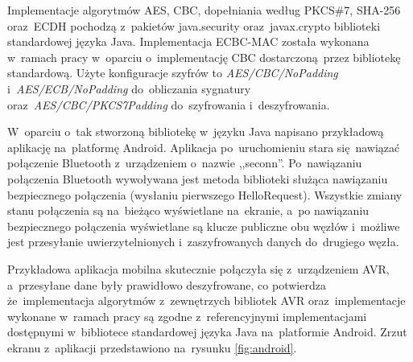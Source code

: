 Implementacje algorytmów AES, CBC, dopełniania według PKCS\#7, SHA-256 oraz~ECDH pochodzą z~pakietów java.security oraz~javax.crypto biblioteki standardowej języka Java. Implementacja ECBC-MAC została wykonana w~ramach pracy w~oparciu o~implementację CBC dostarczoną przez bibliotekę standardową. Użyte konfiguracje szyfrów to \emph{AES/CBC/NoPadding} i~\emph{AES/ECB/NoPadding} do~obliczania sygnatury oraz~\emph{AES/CBC/PKCS7Padding} do~szyfrowania i~deszyfrowania.

W~oparciu o~tak stworzoną bibliotekę w~języku Java napisano przykładową aplikację na~platformę Android. Aplikacja po~uruchomieniu stara się nawiązać połączenie Bluetooth z~urządzeniem o~nazwie ,,seconn''. Po~nawiązaniu połączenia Bluetooth wywoływana jest metoda biblioteki służąca nawiązaniu bezpiecznego połączenia (wysłaniu pierwszego HelloRequest). Wszystkie zmiany stanu połączenia są na~bieżąco wyświetlane na~ekranie, a~po nawiązaniu bezpiecznego połączenia wyświetlane są klucze publiczne obu węzłów i~możliwe jest przesyłanie uwierzytelnionych i~zaszyfrowanych danych do~drugiego węzła.

Przykładowa aplikacja mobilna skutecznie połączyła się z~urządzeniem AVR, a~przesyłane dane były prawidłowo deszyfrowane, co potwierdza że~implementacja algorytmów z~zewnętrzych bibliotek AVR oraz~implementacje wykonane w~ramach pracy są zgodne z~referencyjnymi implementacjami dostępnymi w~bibliotece standardowej języka Java na~platformie Android. Zrzut ekranu z~aplikacji przedstawiono na~rysunku \ref{fig:android}.

